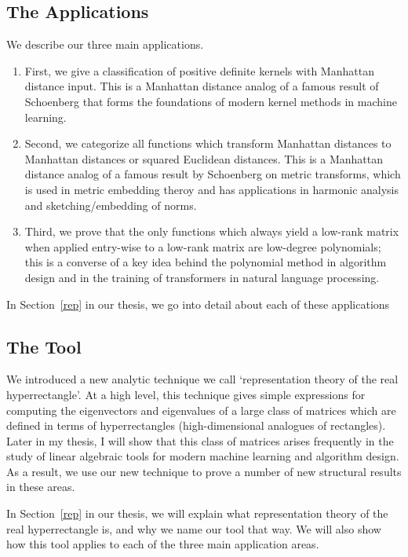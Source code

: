 \subsection{The Applications}
We describe our three main applications. 
\begin{enumerate}
\item First, we
give a classification of positive definite kernels with Manhattan
distance input. This is a Manhattan distance analog of a famous result
of Schoenberg that forms the foundations of modern kernel methods in
machine learning. 
\item Second, we categorize all functions which transform
Manhattan distances to Manhattan distances or squared Euclidean
distances. This is a Manhattan distance analog of a famous result by
Schoenberg on metric transforms, which is used in metric embedding
theroy and has applications in harmonic analysis and sketching/embedding
of norms. 
\item Third, we prove that the only functions which always yield a low-rank matrix when applied entry-wise to a low-rank matrix are low-degree polynomials; this is a converse of a key idea behind the polynomial method in algorithm design and in the training of transformers in natural language processing. 
\end{enumerate}

In Section~\ref{rep} in our thesis, we go into detail about each of
these applications

\subsection{The Tool}
We introduced a new analytic technique we call
`representation theory of the real hyperrectangle'. At a high level,
  this technique gives simple expressions for computing the eigenvectors
  and eigenvalues of a large class of matrices which are defined in
  terms of hyperrectangles (high-dimensional analogues of rectangles).
  Later in my thesis, I will show that this class of matrices arises
  frequently in the study of linear algebraic tools for modern machine
  learning and algorithm design. As a result, we use our new technique
  to prove a number of new structural results in these areas.

  In Section~\ref{rep} in our thesis, we will explain what
  representation theory of the real hyperrectangle is, and why we name
  our tool that way. We will also show how this tool applies to each of
  the three main application areas.

